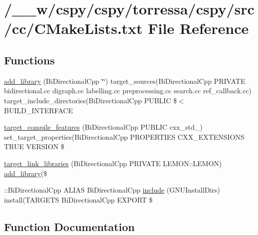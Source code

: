 \hypertarget{CMakeLists_8txt}{}\section{/\+\_\+\+\_\+w/cspy/cspy/torressa/cspy/src/cc/\+C\+Make\+Lists.txt File Reference}
\label{CMakeLists_8txt}
\subsection*{Functions}
\begin{DoxyCompactItemize}
\item 
\hyperlink{CMakeLists_8txt_a530d002ea51aad16e3b24af8b91909a6}{add\+\_\+library} (Bi\+Directional\+Cpp \char`\"{}\char`\"{}) target\+\_\+sources(Bi\+Directional\+Cpp P\+R\+I\+V\+A\+TE bidirectional.\+cc digraph.\+cc labelling.\+cc preprocessing.\+cc search.\+cc ref\+\_\+callback.\+cc) target\+\_\+include\+\_\+directories(Bi\+Directional\+Cpp P\+U\+B\+L\+IC \$$<$ B\+U\+I\+L\+D\+\_\+\+I\+N\+T\+E\+R\+F\+A\+CE
\item 
\hyperlink{CMakeLists_8txt_a00c087720f9edbbf1b0a5104e733487e}{target\+\_\+compile\+\_\+features} (Bi\+Directional\+Cpp P\+U\+B\+L\+IC cxx\+\_\+std\+\_) set\+\_\+target\+\_\+properties(Bi\+Directional\+Cpp P\+R\+O\+P\+E\+R\+T\+I\+ES C\+X\+X\+\_\+\+E\+X\+T\+E\+N\+S\+I\+O\+NS T\+R\+UE V\+E\+R\+S\+I\+ON \$
\item 
\hyperlink{CMakeLists_8txt_a3bcb5f9875f0f268c3420afcd58e76dd}{target\+\_\+link\+\_\+libraries} (Bi\+Directional\+Cpp P\+R\+I\+V\+A\+TE L\+E\+M\+O\+N\+::\+L\+E\+M\+ON) \hyperlink{CMakeLists_8txt_a530d002ea51aad16e3b24af8b91909a6}{add\+\_\+library}(\$
\item 
\+::Bi\+Directional\+Cpp A\+L\+I\+AS Bi\+Directional\+Cpp \hyperlink{CMakeLists_8txt_a0c926cafdaac2134c40ef08e5a3d03a7}{include} (G\+N\+U\+Install\+Dirs) install(T\+A\+R\+G\+E\+TS Bi\+Directional\+Cpp E\+X\+P\+O\+RT \$
\end{DoxyCompactItemize}


\subsection{Function Documentation}
\mbox{\label{CMakeLists_8txt_a530d002ea51aad16e3b24af8b91909a6}} 

